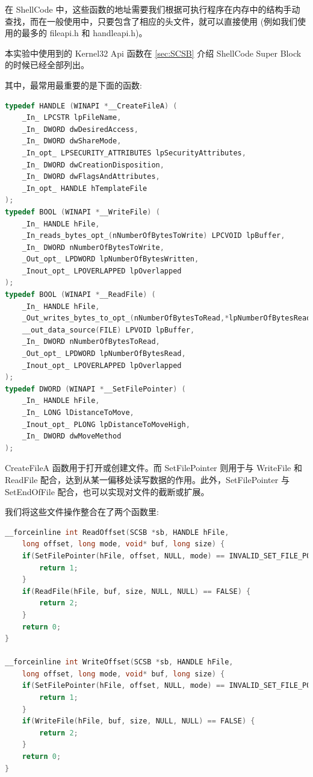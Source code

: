 \documentclass[UTF8]{ctexart}
\begin{document}
    在 ShellCode 中，这些函数的地址需要我们根据可执行程序在内存中的结构手动查找，而在一般使用中，只要包含了相应的头文件，就可以直接使用 (例如我们使用的最多的 fileapi.h 和 handleapi.h)。

    本实验中使用到的 Kernel32 Api 函数在 \ref{sec:SCSB} 介绍 ShellCode Super Block 的时候已经全部列出。

    其中，最常用最重要的是下面的函数:

    \begin{lstlisting}[language=C, caption={常用 API}, captionpos=b]
typedef HANDLE (WINAPI *__CreateFileA) (
    _In_ LPCSTR lpFileName,
    _In_ DWORD dwDesiredAccess,
    _In_ DWORD dwShareMode,
    _In_opt_ LPSECURITY_ATTRIBUTES lpSecurityAttributes,
    _In_ DWORD dwCreationDisposition,
    _In_ DWORD dwFlagsAndAttributes,
    _In_opt_ HANDLE hTemplateFile
);
typedef BOOL (WINAPI *__WriteFile) (
    _In_ HANDLE hFile,
    _In_reads_bytes_opt_(nNumberOfBytesToWrite) LPCVOID lpBuffer,
    _In_ DWORD nNumberOfBytesToWrite,
    _Out_opt_ LPDWORD lpNumberOfBytesWritten,
    _Inout_opt_ LPOVERLAPPED lpOverlapped
);
typedef BOOL (WINAPI *__ReadFile) (
    _In_ HANDLE hFile,
    _Out_writes_bytes_to_opt_(nNumberOfBytesToRead,*lpNumberOfBytesRead)
    __out_data_source(FILE) LPVOID lpBuffer,
    _In_ DWORD nNumberOfBytesToRead,
    _Out_opt_ LPDWORD lpNumberOfBytesRead,
    _Inout_opt_ LPOVERLAPPED lpOverlapped
);
typedef DWORD (WINAPI *__SetFilePointer) (
    _In_ HANDLE hFile,
    _In_ LONG lDistanceToMove,
    _Inout_opt_ PLONG lpDistanceToMoveHigh,
    _In_ DWORD dwMoveMethod
);
    \end{lstlisting}

    CreateFileA 函数用于打开或创建文件。而 SetFilePointer 则用于与 WriteFile 和 ReadFile 配合，达到从某一偏移处读写数据的作用。此外，SetFilePointer 与 SetEndOfFile 配合，也可以实现对文件的截断或扩展。

    我们将这些文件操作整合在了两个函数里:

    \begin{lstlisting}[language=C, caption={Read/Write File}, captionpos=b]
__forceinline int ReadOffset(SCSB *sb, HANDLE hFile,
    long offset, long mode, void* buf, long size) {
    if(SetFilePointer(hFile, offset, NULL, mode) == INVALID_SET_FILE_POINTER) {
        return 1;
    }
    if(ReadFile(hFile, buf, size, NULL, NULL) == FALSE) {
        return 2;
    }
    return 0;
}

__forceinline int WriteOffset(SCSB *sb, HANDLE hFile,
    long offset, long mode, void* buf, long size) {
    if(SetFilePointer(hFile, offset, NULL, mode) == INVALID_SET_FILE_POINTER) {
        return 1;
    }
    if(WriteFile(hFile, buf, size, NULL, NULL) == FALSE) {
        return 2;
    }
    return 0;
}
    \end{lstlisting}
\end{document}
